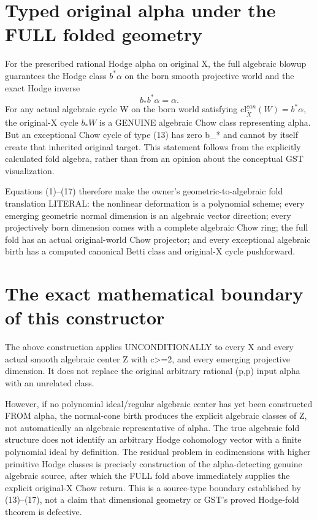 \documentclass[11pt]{article}
\begin{document}
\section{Typed original alpha under the FULL folded geometry}
For the prescribed rational Hodge alpha on original X,
the full algebraic blowup guarantees the Hodge class
$b^*\alpha$ on the born smooth projective world and
the exact Hodge inverse
\[
 \boxed{b_*b^*\alpha=\alpha.}                      \tag{17}
\]
For any actual algebraic cycle W on the born world
satisfying $\mathrm{cl}^{can}_{\widetilde X}(W)=b^*\alpha$,
the original-X cycle $b_*W$ is a GENUINE algebraic
Chow class representing alpha. But an exceptional
Chow cycle of type (13) has zero b_* and cannot by
itself create that inherited original target.
This statement follows from the explicitly calculated
fold algebra, rather than from an opinion about the
conceptual GST visualization.

Equations (1)--(17) therefore make the owner's
geometric-to-algebraic fold translation LITERAL:
the nonlinear deformation is a polynomial scheme;
every emerging geometric normal dimension is an
algebraic vector direction; every projectively born
dimension comes with a complete algebraic Chow ring;
the full fold has an actual original-world Chow
projector; and every exceptional algebraic birth
has a computed canonical Betti class and original-X
cycle pushforward.

\section{The exact mathematical boundary of this constructor}
The above construction applies UNCONDITIONALLY
to every X and every actual smooth algebraic center Z
with c>=2, and every emerging projective dimension.
It does not replace the original arbitrary
rational (p,p) input alpha with an unrelated class.

However, if no polynomial ideal/regular algebraic center
has yet been constructed FROM alpha, the normal-cone
birth produces the explicit algebraic classes of Z,
not automatically an algebraic representative of alpha.
The true algebraic fold structure does not identify
an arbitrary Hodge cohomology vector with a
finite polynomial ideal by definition.
The residual problem in codimensions with higher
primitive Hodge classes is precisely construction
of the alpha-detecting genuine algebraic source,
after which the FULL fold above immediately supplies
the explicit original-X Chow return.
This is a source-type boundary established by
(13)--(17), not a claim that dimensional geometry
or GST's proved Hodge-fold theorem is defective.
\end{document}
